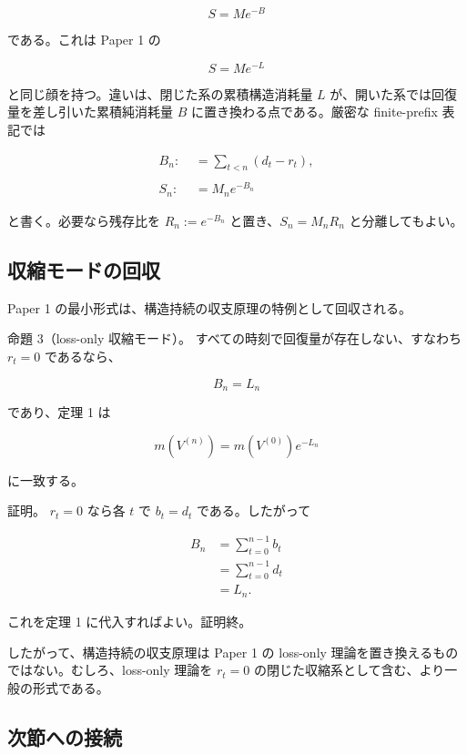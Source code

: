 \documentclass[12pt,a4paper]{article}
\begin{document}
\[
S = M e^{-B}
\]

である。これは Paper 1 の

\[
S = M e^{-L}
\]

と同じ顔を持つ。違いは、閉じた系の累積構造消耗量 \(L\) が、開いた系では回復量を差し引いた累積純消耗量 \(B\) に置き換わる点である。厳密な finite-prefix 表記では

\[
\begin{aligned}
B_{n} :&= \sum_{t<n}(d_{t}-r_{t}), \\
\qquad \\
S_{n} :&= M_{n} e^{-B_{n}}
\end{aligned}
\]

と書く。必要なら残存比を \(R_{n}:=e^{-B_{n}}\) と置き、\(S_{n}=M_{n} R_{n}\) と分離してもよい。

\subsection{収縮モードの回収}\label{ux53ceux7e2eux30e2ux30fcux30c9ux306eux56deux53ce}

Paper 1 の最小形式は、構造持続の収支原理の特例として回収される。

命題 3（loss-only 収縮モード）。 すべての時刻で回復量が存在しない、すなわち \(r_{t}=0\) であるなら、

\[
B_{n} = L_{n}
\]

であり、定理 1 は

\[
m(V^{(n)}) = m(V^{(0)}) e^{-L_{n}}
\]

に一致する。

証明。 \(r_{t}=0\) なら各 \(t\) で \(b_{t}=d_{t}\) である。したがって

\[
\begin{aligned}
B_{n} &= \sum_{t=0}^{n-1} b_{t} \\
&= \sum_{t=0}^{n-1} d_{t} \\
&= L_{n}.
\end{aligned}
\]

これを定理 1 に代入すればよい。証明終。

したがって、構造持続の収支原理は Paper 1 の loss-only 理論を置き換えるものではない。むしろ、loss-only 理論を \(r_{t}=0\) の閉じた収縮系として含む、より一般の形式である。

\subsection{次節への接続}\label{ux6b21ux7bc0ux3078ux306eux63a5ux7d9a}
\end{document}
